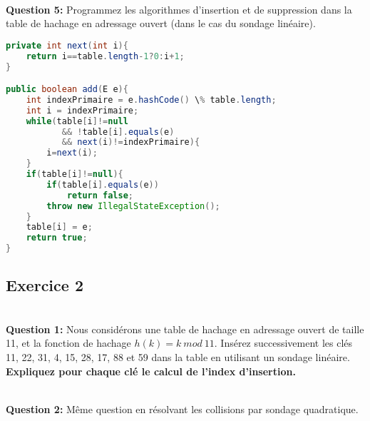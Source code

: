 \documentclass[iutinfo, a4paper, nocorrection, 10pt]{ustl-tdtp}
\begin{document}
~\\ \textbf{Question 5:} Programmez les algorithmes d'insertion et de suppression dans la table de hachage en adressage ouvert (dans le cas du sondage linéaire).

\begin{solution}
{\color{red}
\begin{lstlisting}[language=Java]
private int next(int i){
    return i==table.length-1?0:i+1;
}

public boolean add(E e){
    int indexPrimaire = e.hashCode() \% table.length;
    int i = indexPrimaire;
    while(table[i]!=null 
           && !table[i].equals(e)
           && next(i)!=indexPrimaire){
        i=next(i);
    }
    if(table[i]!=null){
        if(table[i].equals(e))
            return false;
        throw new IllegalStateException();
    }
    table[i] = e;
    return true;
}
\end{lstlisting}
}
\end{solution}


\subsection*{Exercice 2}

~\\ \textbf{Question 1:} Nous considérons une table de hachage en adressage ouvert de taille 11, et la fonction de hachage $h(k) = k~mod~11$. Insérez successivement les clés 11, 22, 31, 4, 15, 28, 17, 88 et 59 dans la table en utilisant un sondage linéaire. \textbf{Expliquez pour chaque clé le calcul de l'index d'insertion.}


~\\ \textbf{Question 2:} Même question en résolvant les collisions par sondage quadratique.

\end{document}
